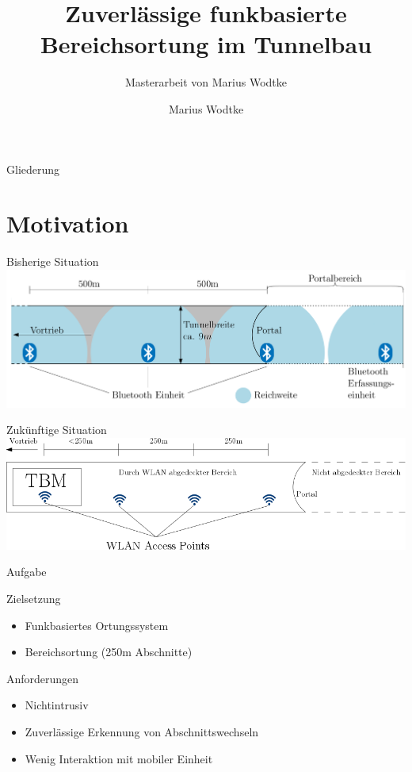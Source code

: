 \documentclass[18pt]{beamer}
\title[Funkbasierte Bereichsortung]{Zuverlässige funkbasierte
Bereichsortung im Tunnelbau}
\subtitle{Masterarbeit von Marius Wodtke}
\author{Marius Wodtke}
\institute{Instuitut für angewandte Informatik und Formale Beschreibungsverfahren}
\begin{document}

\begin{frame}
\titlepage
\end{frame}

\begin{frame}{Gliederung}
\tableofcontents
\end{frame}

\section{Motivation}
\begin{frame}{Bisherige Situation}
\includegraphics[width=\textwidth]{images/bisherige.png}\\
\cite{maurer2016unterstuetzung}
\end{frame}

\begin{frame}{Zukünftige Situation}
\includegraphics[width=\textwidth]{images/zukuenftige.png}
\end{frame}

\begin{frame}{Aufgabe}
\begin{block}{Zielsetzung}
\begin{itemize}
\item Funkbasiertes Ortungssystem
\item Bereichsortung (250m Abschnitte)
\end{itemize}
\end{block}

\begin{block}{Anforderungen}
\begin{itemize}
\item Nichtintrusiv 
\item Zuverlässige Erkennung von Abschnittswechseln
\item Wenig Interaktion mit mobiler Einheit
\end{itemize}
\end{block}
\end{frame}
\end{document}
